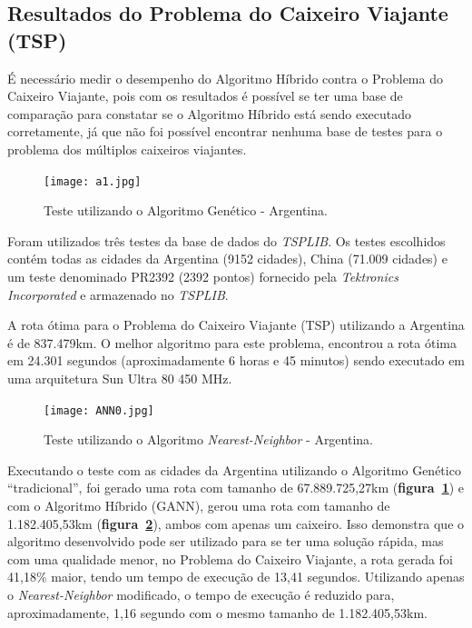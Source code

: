 \documentclass[12pt,openright,a4paper,oneside]{tcc}
\begin{document}
		\subsection{Resultados do Problema do Caixeiro Viajante (TSP)}

		É necessário medir o desempenho do Algoritmo Híbrido contra o Problema do Caixeiro Viajante, pois com os resultados é possível se ter uma base de comparação para constatar se o Algoritmo Híbrido está sendo executado corretamente, já que não foi possível encontrar nenhuma base de testes para o problema dos múltiplos caixeiros viajantes.

        \begin{figure}[h]
            \centering
            \caption{Teste utilizando o Algoritmo Genético - Argentina.}
            \texttt{[image: a1.jpg]}
            \label{figa1}
        \end{figure}

		Foram utilizados três testes da base de dados do \textit{TSPLIB}. Os testes escolhidos contém todas as cidades da Argentina (9152 cidades), China (71.009 cidades) e um teste denominado PR2392 (2392 pontos) fornecido pela \textit{Tektronics Incorporated} e armazenado no \textit{TSPLIB}. 

        A rota ótima para o Problema do Caixeiro Viajante (TSP) utilizando a Argentina é de 837.479km. O melhor algoritmo para este problema, encontrou a rota ótima em 24.301 segundos (aproximadamente 6 horas e 45 minutos) sendo executado em uma arquitetura Sun Ultra 80 450 MHz.

        \begin{figure}[h]
            \centering
            \caption{Teste utilizando o Algoritmo \textit{Nearest-Neighbor} - Argentina.}
            \texttt{[image: ANN0.jpg]}
            \label{figANN0}
        \end{figure}		

		Executando o teste com as cidades da Argentina utilizando o Algoritmo Genético ``tradicional'', foi gerado uma rota com tamanho de 67.889.725,27km (\textbf{figura~\ref{figa1}}) e com o Algoritmo Híbrido (GANN), gerou uma rota com tamanho de 1.182.405,53km (\textbf{figura~\ref{figANN0}}), ambos com apenas um caixeiro. Isso demonstra que o algoritmo desenvolvido pode ser utilizado para se ter uma solução rápida, mas com uma qualidade menor, no Problema do Caixeiro Viajante, a rota gerada foi 41,18\% maior, tendo um tempo de execução de 13,41 segundos. Utilizando apenas o \textit{Nearest-Neighbor} modificado, o tempo de execução é reduzido para, aproximadamente, 1,16 segundo com o mesmo tamanho de 1.182.405,53km.
\end{document}
